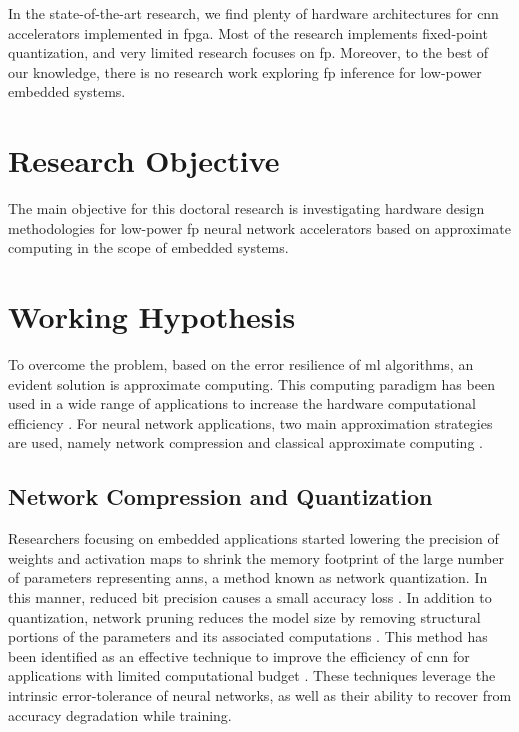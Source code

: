 In the state-of-the-art research, we find plenty of hardware architectures for \gls{cnn} accelerators implemented in \gls{fpga}. Most of the research implements fixed-point quantization, and very limited research focuses on \gls{fp}. Moreover, to the best of our knowledge, there is no research work exploring \gls{fp} inference for low-power embedded systems.

\section{Research Objective}
The main objective for this doctoral research is investigating hardware design methodologies for low-power \gls{fp} neural network accelerators based on approximate computing in the scope of embedded systems.

\section{Working Hypothesis}
To overcome the problem, based on the error resilience of \gls{ml} algorithms, an evident solution is approximate computing. This computing paradigm has been used in a wide range of applications to increase the hardware computational efficiency \cite{han2013approximate}. For neural network applications, two main approximation strategies are used, namely network compression and classical approximate computing \cite{bouvier2019spiking}.

\subsection{Network Compression and Quantization}
Researchers focusing on embedded applications started lowering the precision of weights and activation maps to shrink the memory footprint of the large number of parameters representing \glspl{ann}, a method known as network quantization. In this manner, reduced bit precision causes a small accuracy loss \cite{courbariaux2015binaryconnect, han2015deep, hubara2017quantized, rastegari2016xnor}. In addition to quantization, network pruning reduces the model size by removing structural portions of the parameters and its associated computations \cite{lecun1989optimal,hassibi1992second}. This method has been identified as an effective technique to improve the efficiency of \gls{cnn} for applications with limited computational budget \cite{molchanov2016pruning,li2016pruning, liu2018rethinking}. These techniques leverage the intrinsic error-tolerance of neural networks, as well as their ability to recover from accuracy degradation while training.

